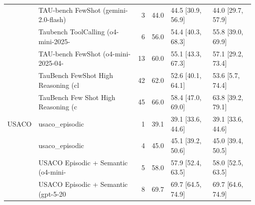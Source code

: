 \begin{longtable}{llrrll}
 & TAU-bench FewShot (gemini-2.0-flash) & 3 & 44.0 & 44.5 [30.9, 56.9] & 44.0 [29.7, 57.9] \\
 & Taubench ToolCalling (o4-mini-2025-~ & 6 & 56.0 & 54.4 [40.3, 68.3] & 55.8 [39.0, 69.9] \\
 & TAU-bench FewShot (o4-mini-2025-04-~ & 13 & 60.0 & 55.1 [43.3, 67.3] & 57.1 [29.2, 73.4] \\
 & TauBench FewShot High Reasoning (cl~ & 42 & 62.0 & 52.6 [40.1, 64.1] & 53.6 [5.7, 74.4] \\
 & TauBench Few Shot High Reasoning (c~ & 45 & 66.0 & 58.4 [47.0, 69.0] & 63.8 [39.2, 79.1] \\
USACO & usaco\_episodic & 1 & 39.1 & 39.1 [33.6, 44.6] & 39.1 [33.6, 44.6] \\
 & usaco\_episodic & 4 & 45.0 & 45.1 [39.2, 50.6] & 45.0 [39.4, 50.5] \\
 & USACO Episodic + Semantic (o4-mini-~ & 5 & 58.0 & 57.9 [52.4, 63.5] & 58.0 [52.5, 63.5] \\
 & USACO Episodic + Semantic (gpt-5-20~ & 8 & 69.7 & 69.7 [64.5, 74.9] & 69.7 [64.6, 74.9] \\
\end{longtable}
